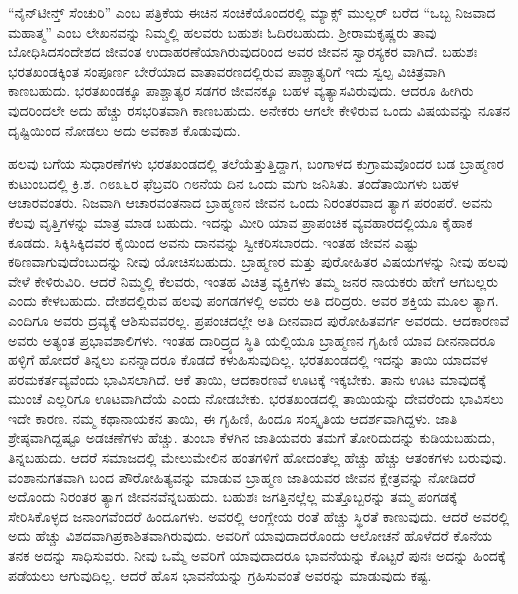 “ನೈನ್​ಟೀನ್ತ್​ ಸೆಂಚುರಿ” ಎಂಬ ಪತ್ರಿಕೆಯ ಈಚಿನ ಸಂಚಿಕೆಯೊಂದರಲ್ಲಿ ಮ್ಯಾಕ್ಸ್​ ಮುಲ್ಲರ್​ ಬರೆದ “ಒಬ್ಬ ನಿಜವಾದ ಮಹಾತ್ಮ” ಎಂಬ ಲೇಖನವನ್ನು ನಿಮ್ಮಲ್ಲಿ ಹಲವರು ಬಹುಶಃ ಓದಿರಬಹುದು. ಶ‍್ರೀರಾಮಕೃಷ್ಣರು ತಾವು ಬೋಧಿಸಿದಸಂದೇಶದ ಜೀವಂತ ಉದಾಹರಣೆಯಾಗಿರುವುದರಿಂದ ಅವರ ಜೀವನ ಸ್ವಾರಸ್ಯಕರ ವಾಗಿದೆ. ಬಹುಶಃ ಭರತಖಂಡಕ್ಕಿಂತ ಸಂಪೂರ್ಣ ಬೇರೆಯಾದ ವಾತಾವರಣದಲ್ಲಿರುವ ಪಾಶ್ಚಾತ್ಯರಿಗೆ ಇದು ಸ್ವಲ್ಪ ವಿಚಿತ್ರವಾಗಿ ಕಾಣಬಹುದು. ಭರತಖಂಡಕ್ಕೂ ಪಾಶ್ಚಾತ್ಯರ ಸಡಗರ ಜೀವನಕ್ಕೂ ಬಹಳ ವ್ಯತ್ಯಾಸವಿರುವುದು. ಆದರೂ ಹೀಗಿರು ವುದರಿಂದಲೇ ಅದು ಹೆಚ್ಚು ರಸಭರಿತವಾಗಿ ಕಾಣಬಹುದು. ಅನೇಕರು ಆಗಲೇ ಕೇಳಿರುವ ಒಂದು ವಿಷಯವನ್ನು ನೂತನ ದೃಷ್ಟಿಯಿಂದ ನೋಡಲು ಅದು ಅವಕಾಶ ಕೊಡುವುದು.

ಹಲವು ಬಗೆಯ ಸುಧಾರಣೆಗಳು ಭರತಖಂಡದಲ್ಲಿ ತಲೆಯೆತ್ತುತ್ತಿದ್ದಾಗ, ಬಂಗಾಳದ ಕುಗ್ರಾಮವೊಂದರ ಬಡ ಬ್ರಾಹ್ಮಣರ ಕುಟುಂಬದಲ್ಲಿ ಕ್ರಿ.ಶ. ೧೮೩೬ರ ಫೆಬ್ರವರಿ ೧೮ನೆಯ ದಿನ ಒಂದು ಮಗು ಜನಿಸಿತು. ತಂದೆತಾಯಿಗಳು ಬಹಳ ಆಚಾರವಂತರು. ನಿಜವಾಗಿ ಆಚಾರವಂತನಾದ ಬ್ರಾಹ್ಮಣನ ಜೀವನ ಒಂದು ನಿರಂತರವಾದ ತ್ಯಾಗ ಪರಂಪರೆ. ಅವನು ಕೆಲವು ವೃತ್ತಿಗಳನ್ನು ಮಾತ್ರ ಮಾಡ ಬಹುದು. ಇದನ್ನು ಮೀರಿ ಯಾವ ಪ್ರಾಪಂಚಿಕ ವ್ಯವಹಾರದಲ್ಲಿಯೂ ಕೈಹಾಕ ಕೂಡದು. ಸಿಕ್ಕಿಸಿಕ್ಕಿದವರ ಕೈಯಿಂದ ಅವನು ದಾನವನ್ನು ಸ್ವೀಕರಿಸಬಾರದು. ಇಂತಹ ಜೀವನ ಎಷ್ಟು ಕಠಿಣವಾಗುವುದೆಂಬುದನ್ನು ನೀವು ಯೋಚಿಸಬಹುದು. ಬ್ರಾಹ್ಮಣರ ಮತ್ತು ಪುರೋಹಿತರ ವಿಷಯಗಳನ್ನು ನೀವು ಹಲವು ವೇಳೆ ಕೇಳಿರುವಿರಿ. ಆದರೆ ನಿಮ್ಮಲ್ಲಿ ಕೆಲವರು, ಇಂತಹ ವಿಚಿತ್ರ ವ್ಯಕ್ತಿಗಳು ತಮ್ಮ ಜನರ ನಾಯಕರು ಹೇಗೆ ಆಗಬಲ್ಲರು ಎಂದು ಕೇಳಬಹುದು. ದೇಶದಲ್ಲಿರುವ ಹಲವು ಪಂಗಡಗಳಲ್ಲಿ ಅವರು ಅತಿ ದರಿದ್ರರು. ಅವರ ಶಕ್ತಿಯ ಮೂಲ ತ್ಯಾಗ. ಎಂದಿಗೂ ಅವರು ದ್ರವ್ಯಕ್ಕೆ ಆಶಿಸುವವರಲ್ಲ. ಪ್ರಪಂಚದಲ್ಲೇ ಅತಿ ದೀನವಾದ ಪುರೋಹಿತವರ್ಗ ಅವರದು. ಆದಕಾರಣವೆ ಅವರು ಅತ್ಯಂತ ಪ್ರಭಾವಶಾಲಿಗಳು. ಇಂತಹ ದಾರಿದ್ರ್ಯದ ಸ್ಥಿತಿ ಯಲ್ಲಿಯೂ ಬ್ರಾಹ್ಮಣನ ಗೃಹಿಣಿ ಯಾವ ದೀನನಾದರೂ ಹಳ್ಳಿಗೆ ಹೋದರೆ ತಿನ್ನಲು ಏನನ್ನಾದರೂ ಕೊಡದೆ ಕಳುಹಿಸುವುದಿಲ್ಲ. ಭರತಖಂಡದಲ್ಲಿ ಇದನ್ನು ತಾಯಿ ಯಾದವಳ ಪರಮಕರ್ತವ್ಯವೆಂದು ಭಾವಿಸಲಾಗಿದೆ. ಆಕೆ ತಾಯಿ, ಆದಕಾರಣವೆ ಊಟಕ್ಕೆ ಇಕ್ಕಬೇಕು. ತಾನು ಊಟ ಮಾವುದಕ್ಕೆ ಮುಂಚೆ ಎಲ್ಲರಿಗೂ ಊಟವಾಗಿದೆಯೆ ಎಂದು ನೋಡಬೇಕು. ಭರತಖಂಡದಲ್ಲಿ ತಾಯಿಯನ್ನು ದೇವರೆಂದು ಭಾವಿಸಲು ಇದೇ ಕಾರಣ. ನಮ್ಮ ಕಥಾನಾಯಕನ ತಾಯಿ, ಈ ಗೃಹಿಣಿ, ಹಿಂದೂ ಸಂಸ್ಕೃತಿಯ ಆದರ್ಶವಾಗಿದ್ದಳು. ಜಾತಿ ಶ್ರೇಷ್ಠವಾಗಿದ್ದಷ್ಟೂ ಅಡಚಣೆಗಳು ಹೆಚ್ಚು. ತುಂಬಾ ಕೆಳಗಿನ ಜಾತಿಯವರು ತಮಗೆ ತೋರಿದುದನ್ನು ಕುಡಿಯಬಹುದು, ತಿನ್ನಬಹುದು. ಆದರೆ ಸಮಾಜದಲ್ಲಿ ಮೇಲುಮೇಲಿನ ಹಂತಗಳಿಗೆ ಹೋದಂತೆಲ್ಲ ಹೆಚ್ಚು ಹೆಚ್ಚು ಆತಂಕಗಳು ಬರುವುವು. ವಂಶಾನುಗತವಾಗಿ ಬಂದ ಪೌರೋಹಿತ್ಯವನ್ನು ಮಾಡುವ ಬ್ರಾಹ್ಮಣ ಜಾತಿಯವರ ಜೀವನ ಕ್ಷೇತ್ರವನ್ನು ನೋಡಿದರೆ ಅದೊಂದು ನಿರಂತರ ತ್ಯಾಗ ಜೀವನವೆನ್ನಬಹುದು. ಬಹುಶಃ ಜಗತ್ತಿನಲ್ಲೆಲ್ಲ ಮತ್ತೊಬ್ಬರನ್ನು ತಮ್ಮ ಪಂಗಡಕ್ಕೆ ಸೇರಿಸಿಕೊಳ್ಳದ ಜನಾಂಗವೆಂದರೆ ಹಿಂದೂಗಳು. ಅವರಲ್ಲಿ ಆಂಗ್ಲೇಯ ರಂತೆ ಹೆಚ್ಚು ಸ್ಥಿರತೆ ಕಾಣುವುದು. ಆದರೆ ಅವರಲ್ಲಿ ಅದು ಹೆಚ್ಚು ವಿಶದವಾಗಿಪ್ರಕಾಶಿತವಾಗಿರುವುದು. ಅವರಿಗೆ ಯಾವುದಾದರೊಂದು ಆಲೋಚನೆ ಹೊಳೆದರೆ ಕೊನೆಯ ತನಕ ಅದನ್ನು ಸಾಧಿಸುವರು. ನೀವು ಒಮ್ಮೆ ಅವರಿಗೆ ಯಾವುದಾದರೂ ಭಾವನೆಯನ್ನು ಕೊಟ್ಟರೆ ಪುನಃ ಅದನ್ನು ಹಿಂದಕ್ಕೆ ಪಡೆಯಲು ಆಗುವುದಿಲ್ಲ. ಆದರೆ ಹೊಸ ಭಾವನೆಯನ್ನು ಗ್ರಹಿಸುವಂತೆ ಅವರನ್ನು ಮಾಡುವುದು ಕಷ್ಟ.

